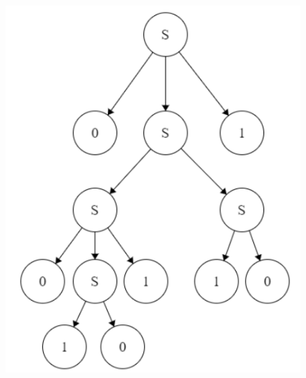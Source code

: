 \documentclass{article}
\begin{document}
\begin{enumerate}
\begin{enumerate}[label=(\alph*)]
\begin{figure}[H]
				\includegraphics[width=0.7\linewidth]{8b}
				\caption{}
				\label{fig:8b}
			\end{figure}
		\end{enumerate}
	\end{enumerate}
\end{document}
